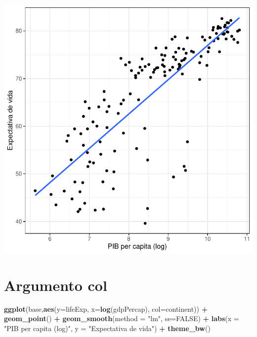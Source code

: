 \documentclass[
]{article}
\newenvironment{Shaded}{\begin{snugshade}}{\end{snugshade}}
\newcommand{\DataTypeTok}[1]{\textcolor[rgb]{0.13,0.29,0.53}{#1}}
\newcommand{\KeywordTok}[1]{\textcolor[rgb]{0.13,0.29,0.53}{\textbf{#1}}}
\newcommand{\NormalTok}[1]{#1}
\newcommand{\OperatorTok}[1]{\textcolor[rgb]{0.81,0.36,0.00}{\textbf{#1}}}
\newcommand{\OtherTok}[1]{\textcolor[rgb]{0.56,0.35,0.01}{#1}}
\newcommand{\StringTok}[1]{\textcolor[rgb]{0.31,0.60,0.02}{#1}}
\begin{document}
\begin{center}\includegraphics{arquivo_pdf_files/figure-latex/scatter2-1} \end{center}

\hypertarget{argumento-col}{%
\section{Argumento col}\label{argumento-col}}

\begin{Shaded}
\begin{Highlighting}[]
\KeywordTok{ggplot}\NormalTok{(base,}\KeywordTok{aes}\NormalTok{(}\DataTypeTok{y=}\NormalTok{lifeExp, }\DataTypeTok{x=}\KeywordTok{log}\NormalTok{(gdpPercap), }\DataTypeTok{col=}\NormalTok{continent)) }\OperatorTok{+}\StringTok{ }\KeywordTok{geom_point}\NormalTok{() }\OperatorTok{+}
\StringTok{  }\KeywordTok{geom_smooth}\NormalTok{(}\DataTypeTok{method =} \StringTok{"lm"}\NormalTok{, }\DataTypeTok{se=}\OtherTok{FALSE}\NormalTok{) }\OperatorTok{+}\StringTok{ }
\StringTok{  }\KeywordTok{labs}\NormalTok{(}\DataTypeTok{x =} \StringTok{"PIB per capita (log)"}\NormalTok{,}
       \DataTypeTok{y =} \StringTok{"Expectativa de vida"}\NormalTok{) }\OperatorTok{+}\StringTok{ }\KeywordTok{theme_bw}\NormalTok{()}
\end{Highlighting}
\end{Shaded}
\end{document}
